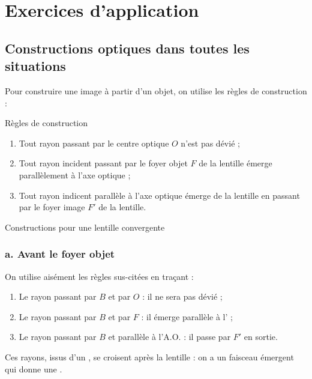 \documentclass[10pt,a5paper,notitlepage]{book}
\begin{document}
\section{Exercices d'application}
\subsection{Constructions optiques dans toutes les situations}

Pour construire une image à partir d'un objet, on utilise les règles de
construction :

\begin{defi}[label = rconst]{Règles de construction}
    \begin{enumerate}
        \item Tout rayon passant par le centre optique $O$ n'est pas dévié ;
        \item Tout rayon incident passant par le foyer objet $F$ de la lentille
            émerge parallèlement à l'axe optique ;
        \item Tout rayon indicent parallèle à l'axe optique émerge de la
            lentille en passant par le foyer image $F'$ de la lentille.
    \end{enumerate}
\end{defi}

\pagebreak

\begin{center}
    \huge Constructions pour une lentille convergente
\end{center}

\subsubsection{a. Avant le foyer objet}
On utilise aisément les règles sus-citées en traçant :
\begin{enumerate}
    \item Le rayon passant par $B$ et par $O$ : il ne sera pas dévié ;
    \item Le rayon passant par $B$ et par $F$ : il émerge parallèle à
        l' ;
    \item Le rayon passant par $B$ et parallèle à l'A.O. : il passe par $F'$ en
        sortie.
\end{enumerate}
Ces rayons, issus d'un , se croisent après la
        lentille : on a un faisceau émergent  qui donne une .
\end{document}
